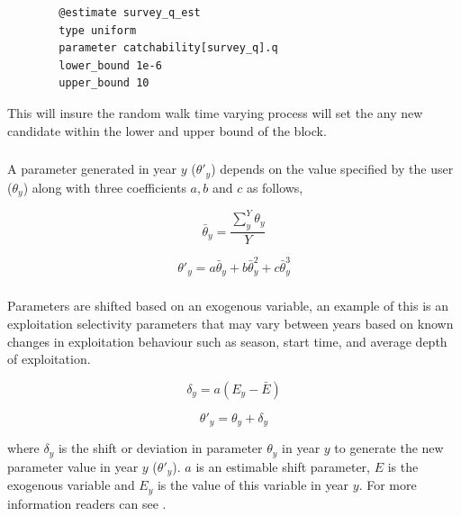 {\small{\begin{verbatim}
		@estimate survey_q_est
		type uniform
		parameter catchability[survey_q].q
		lower_bound 1e-6
		upper_bound 10
		\end{verbatim}}}
This will insure the random walk time varying process will set the any new candidate within the lower and upper bound of the  block.

\subsubsection[Annual shift]{}

A parameter generated in year $y$ ($\theta'_y$) depends on the value specified by the user ($\theta_y$) along with three coefficients $a,b$ and $c$ as follows,

\begin{equation}
\bar{\theta}_y = \frac{\sum_{y}^Y\theta_y}{Y}
\end{equation}

\begin{equation}
\theta'_y = a \bar{\theta}_y + b\bar{\theta}_y^{2} + c\bar{\theta}_y^{3}
\end{equation}

\subsubsection[Exogenous]{}

Parameters are shifted based on an exogenous variable, an example of this is an exploitation selectivity parameters that may vary between years based on known changes in exploitation behaviour such as season, start time, and average depth of exploitation.

\begin{equation}
\delta_y = a(E_y - \bar{E})
\end{equation}

\begin{equation}
\theta'_y = \theta_y + \delta_y
\end{equation}

where $\delta_y$ is the shift or deviation in parameter $\theta_y$ in year $y$ to generate the new parameter value in year $y$ ($\theta'_y$). $a$ is an estimable shift parameter, $E$ is the exogenous variable and $E_y$ is the value of this variable in year $y$. For more information readers can see \cite{francis_03}.

